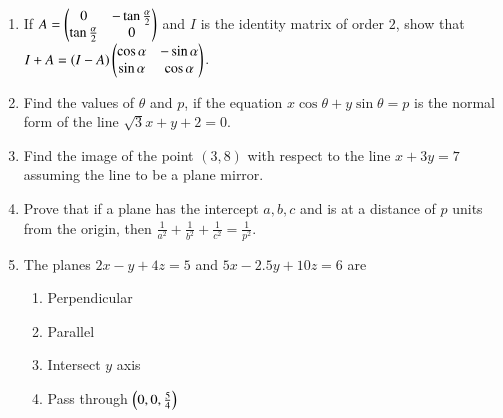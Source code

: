 \begin{enumerate}[label=\thesubsection.\arabic*,ref=\thesubsection.\theenumi]
\item If $A=\begin{pmatrix}0 & -\tan \frac{\alpha}{2} \\ \tan \frac{\alpha}{2} & 0\end{pmatrix}$  and $I$ is the identity matrix of order $2$, show that $I+A= (I-A) \begin{pmatrix}\cos \alpha & -\sin \alpha \\ \sin \alpha & \cos \alpha\end{pmatrix}$.
\item Find the values of $\theta$ and $p$, if the equation $x \cos \theta + y \sin \theta = p$ is the normal form of the line $\sqrt 3x+y+2=0$.
\item Find the image of the point $(3,8)$ with respect to the line $x+3y=7$ assuming the line to be a plane mirror.
\item Prove that if a plane has the intercept $a,b,c$ and is at a distance of $p$ units  from the origin, then $\frac{1}{a^2}+\frac{1}{b^2}+\frac{1}{c^2}=\frac{1}{p^2}.$
\item The planes $2x-y+4z=5$ and $5x-2.5y+10z=6$ are 
\begin{enumerate}
\item Perpendicular
\item Parallel
\item Intersect $y$ axis
\item Pass through $\begin{pmatrix}0,0,\frac{5}{4}\end{pmatrix}$
\end{enumerate}
\end{enumerate}

